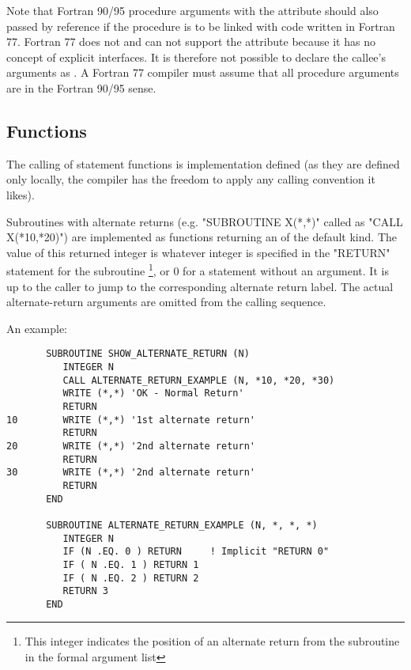 Note that Fortran 90/95 procedure arguments with the 
attribute should also passed by reference if the procedure is to be
linked with code written in Fortran 77.  Fortran 77 does not and can
not support the  attribute because it has no concept of
explicit interfaces.  It is therefore not possible to declare the
callee's arguments as .  A Fortran 77 compiler must
assume that all procedure arguments are  in the
Fortran 90/95 sense.


\subsection{Functions}

The calling of statement functions is implementation defined (as they
are defined only locally, the compiler has the freedom to apply any
calling convention it likes).

Subroutines with alternate returns (e.g. "SUBROUTINE X(*,*)" called
as "CALL X(*10,*20)") are implemented as functions returning
an  of the default kind.  The value of this returned integer
is whatever integer is specified in the "RETURN" statement for
the subroutine \footnote{
This integer indicates the position of an alternate
return from the subroutine in the formal argument list}, or 0 for
a  statement without an argument.  It is up to the caller
to jump to the corresponding alternate return label.  The actual
alternate-return arguments are omitted from the calling sequence.

An example:

\begin{footnotesize}
\begin{verbatim}
       SUBROUTINE SHOW_ALTERNATE_RETURN (N)
          INTEGER N
          CALL ALTERNATE_RETURN_EXAMPLE (N, *10, *20, *30)
          WRITE (*,*) 'OK - Normal Return'
          RETURN
10        WRITE (*,*) '1st alternate return'
          RETURN
20        WRITE (*,*) '2nd alternate return'
          RETURN
30        WRITE (*,*) '2nd alternate return'
          RETURN
       END

       SUBROUTINE ALTERNATE_RETURN_EXAMPLE (N, *, *, *)
          INTEGER N
          IF (N .EQ. 0 ) RETURN     ! Implicit "RETURN 0"
          IF ( N .EQ. 1 ) RETURN 1
          IF ( N .EQ. 2 ) RETURN 2
          RETURN 3
       END
\end{verbatim}
\end{footnotesize}

